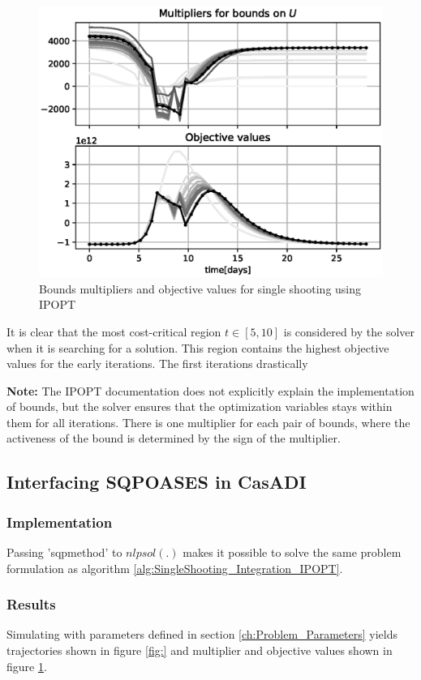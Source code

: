 \begin{figure}[H]
    \centering
    \includegraphics[width=.8\textwidth]{pythonProject/Figures/Single_Shooting_obj_con_IPOPT.eps}
    \caption{Bounds multipliers and objective values for single shooting using IPOPT}
    \label{fig:SH_con_obj_IPOPT}
\end{figure}
It is clear that the most cost-critical region $t\in [5, 10]$ is considered by the solver when it is searching for a solution. This region contains the highest objective values for the early iterations. The first iterations drastically 

\textbf{Note:} The IPOPT documentation does not explicitly explain the implementation of bounds, but the solver ensures that the optimization variables stays within them for all iterations. There is one multiplier for each pair of bounds, where the activeness of the bound is determined by the sign of the multiplier.

\subsection{Interfacing SQPOASES in CasADI}
\subsubsection{Implementation}
Passing 'sqpmethod' to $nlpsol(.)$ makes it possible to solve the same problem formulation as algorithm \ref{alg:SingleShooting_Integration_IPOPT}.

\subsubsection{Results}
Simulating with parameters defined in section \ref{ch:Problem_Parameters} yields trajectories shown in figure \ref{fig:} and multiplier and objective values shown in figure \ref{fig:SH_con_obj_IPOPT}.